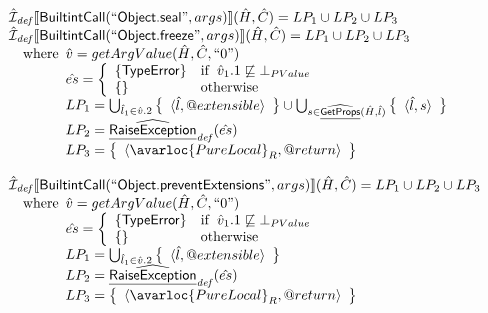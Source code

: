 \[\begin{array}{l}
\aI_{\it def}\lbr \SF{BuiltintCall}(``\SF{Object.seal}",args)\rbr(\hat{H},\hat{C}) = LP_1 \cup LP_2 \cup LP_3\\
\aI_{\it def}\lbr \SF{BuiltintCall}(``\SF{Object.freeze}",args)\rbr(\hat{H},\hat{C}) = LP_1 \cup LP_2 \cup LP_3\\
\quad\wherec{
  \hat{v} = getArgValue(\hat{H}, \hat{C}, ``0")\\
  \hat{es} = \left\{\begin{array}{ll}
      \{ \SF{TypeError} \}
      & \ifc{\hat{v}_1.1 \not\sqsubseteq \bot_{PValue}}\\
      \set{} & \owc
    \end{array}\right.\\
  LP_1 = \bigcup_{\hat{l}_1 \in \hat{v}.2} \set{\langle \hat{l},\varprop{extensible}\rangle} \cup
    \bigcup_{s \in \ahf{GetProps}(\hat{H}, \hat{l})}  \set{\langle \hat{l}, s\rangle}\\
  LP_2 = \ahf{RaiseException}_{\it def}(\hat{es})\\ 
  LP_3 = \set{\langle\avarloc{PureLocal}_R,\varprop{return}\rangle}\\
  }\\
\\

\aI_{\it def}\lbr \SF{BuiltintCall}(``\SF{Object.preventExtensions}",args)\rbr(\hat{H},\hat{C}) = LP_1 \cup LP_2 \cup LP_3\\
\quad\wherec{
  \hat{v} = getArgValue(\hat{H}, \hat{C}, ``0")\\
  \hat{es} = \left\{\begin{array}{ll}
      \{ \SF{TypeError} \}
      & \ifc{\hat{v}_1.1 \not\sqsubseteq \bot_{PValue}}\\
      \set{} & \owc
    \end{array}\right.\\
  LP_1 = \bigcup_{\hat{l}_1 \in \hat{v}.2} \set{\langle \hat{l},\varprop{extensible}\rangle}\\
  LP_2 = \ahf{RaiseException}_{\it def}(\hat{es})\\ 
  LP_3 = \set{\langle\avarloc{PureLocal}_R,\varprop{return}\rangle}\\
  }\\
\\

\end{array}
\]
